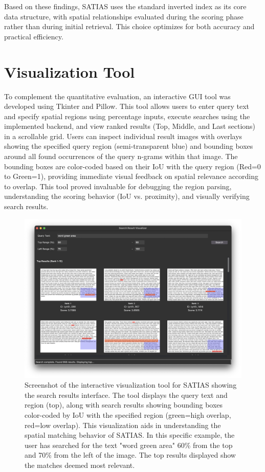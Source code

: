 \documentclass[manuscript,screen]{acmart}
\begin{document}
Based on these findings, SATIAS uses the standard inverted index as its core data structure, with spatial relationships evaluated during the scoring phase rather than during initial retrieval. This choice optimizes for both accuracy and practical efficiency.

\section{Visualization Tool}

To complement the quantitative evaluation, an interactive GUI tool was developed using Tkinter and Pillow. This tool allows users to enter query text and specify spatial regions using percentage inputs, execute searches using the implemented backend, and view ranked results (Top, Middle, and Last sections) in a scrollable grid. Users can inspect individual result images with overlays showing the specified query region (semi-transparent blue) and bounding boxes around all found occurrences of the query n-grams within that image. The bounding boxes are color-coded based on their IoU with the query region (Red=0 to Green=1), providing immediate visual feedback on spatial relevance according to overlap. This tool proved invaluable for debugging the region parsing, understanding the scoring behavior (IoU vs. proximity), and visually verifying search results.

\begin{figure}
    \centering
    \includegraphics[width=\linewidth]{visualization_tool.png}
    \caption{Screenshot of the interactive visualization tool for SATIAS showing the search results interface. The tool displays the query text and region (top), along with search results showing bounding boxes color-coded by IoU with the specified region (green=high overlap, red=low overlap). This visualization aids in understanding the spatial matching behavior of SATIAS. In this specific example, the user has searched for the text "word green area" 60\% from the top and 70\% from the left of the image. The top results displayed show the matches deemed most relevant.}
    \label{fig:visualization-tool}
\end{figure}
\end{document}
